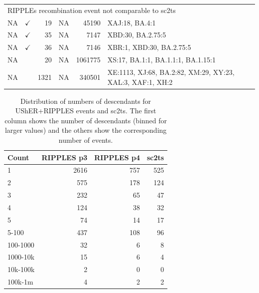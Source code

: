 \documentclass[12pt]{article}
\begin{document}
\begin{table}
\begin{scriptsize}
\begin{tabular}{lrrlrl}
\midrule
\multicolumn{6}{l}{RIPPLEs recombination event not comparable to sc2ts}\\
NA & $\checkmark$ & 19 & NA & 45190 & {XAJ:18, BA.4:1} \\
NA & $\checkmark$ & 35 & NA & 7147 & {XBD:30, BA.2.75:5} \\
NA & $\checkmark$ & 36 & NA & 7146 & {XBR:1, XBD:30, BA.2.75:5} \\
NA &  & 20 & NA & 1061775 & {XS:17, BA.1:1, BA.1.1:1, BA.1.15:1} \\
NA &  & 1321 & NA & 340501 & {XE:1113, XJ:68, BA.2:82, XM:29, XY:23,
XAL:3, XAF:1, XH:2} \\
\bottomrule
\end{tabular}

\end{scriptsize}
\end{table}


\begin{table}
\caption{
Distribution of numbers of descendants for UShER+RIPPLES events
and sc2ts. The first column shows the number of descendants (binned
for larger values) and the others show the corresponding number of events.
}
\label{tab:ripples_sc2ts_event_descendants}
\centering
\begin{tabular}{lrrr}
\toprule
Count & RIPPLES p3 & RIPPLES p4 & sc2ts \\
\midrule
1 & 2616 & 757 & 525 \\
2 & 575 & 178 & 124 \\
3 & 232 & 65 & 47 \\
4 & 124 & 38 & 32 \\
5 & 74 & 14 & 17 \\
5-100 & 437 & 108 & 96 \\
100-1000 & 32 & 6 & 8 \\
1000-10k & 15 & 6 & 4 \\
10k-100k & 2 & 0 & 0 \\
100k-1m & 4 & 2 & 2 \\
\bottomrule
\end{tabular}
\end{table}
\end{document}
